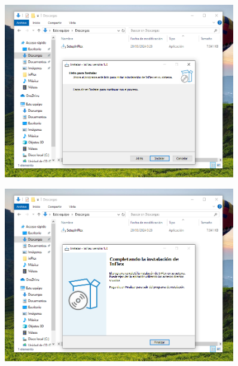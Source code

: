 \begin{figure}[!h]
  \includegraphics*[width=0.9\textwidth]{images/apb05.png}
\end{figure}
\begin{figure}[!h]
  \includegraphics*[width=0.9\textwidth]{images/apb06.png}
\end{figure}

\chapter*{}
\vspace*{-5em}
